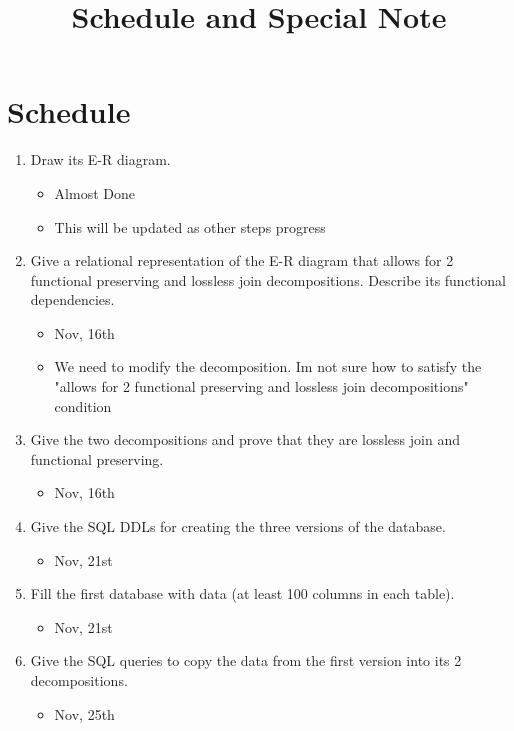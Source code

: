 \documentclass[12pt]{article}
\begin{document}
\def\labelitemi{--}
\title{Schedule and Special Note}
\maketitle

\section{Schedule}


\begin{enumerate}
	\item Draw its E-R diagram.
	\begin{itemize}
		\item Almost Done
		\item {\color{blue} This will be updated as other steps progress}
	\end{itemize}
	\item Give a relational representation of the E-R diagram that allows for 2 functional preserving and lossless join decompositions. Describe its functional dependencies.
 \begin{itemize}
		\item Nov, 16th
		\item {\color{blue} We need to modify the decomposition. Im not sure how to satisfy the "allows for 2 functional preserving and lossless join decompositions" condition}
	\end{itemize}
	\item Give the two decompositions and prove that they are lossless join and functional preserving.
	\begin{itemize}
		\item Nov, 16th
	\end{itemize}
	\item Give the SQL DDLs for creating the three versions of the database.
	\begin{itemize}
		\item Nov, 21st
	\end{itemize}
	\item Fill the first database with data (at least 100 columns in each table).
	\begin{itemize}
		\item Nov, 21st
	\end{itemize}
	\item Give the SQL queries to copy the data from the first version into its 2 decompositions.
	\begin{itemize}
		\item Nov, 25th

\end{itemize}
\end{enumerate}
\end{document}
